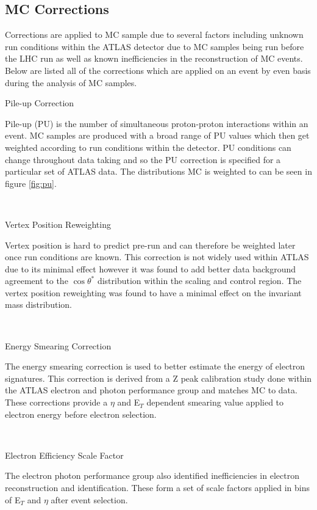 \subsection{MC Corrections}
   \label{sec:correc}

   Corrections are applied to MC sample due to several factors including unknown run conditions within the ATLAS detector due to MC samples being run before the LHC run as well as known inefficiencies in the reconstruction of MC events. Below are listed all of the corrections which are applied on an event by even basis during the analysis of MC samples.\\


   {\bf\raggedright Pile-up Correction}

   {\raggedright Pile-up (PU) is the number of simultaneous proton-proton interactions within an event. MC samples are produced with a broad range of PU values which then get weighted according to run conditions within the detector. PU conditions can change throughout data taking and so the PU correction is specified for a particular set of ATLAS data. The distributions MC is weighted to can be seen in figure \ref{fig:pu}.}\\

   {\bf\raggedright Vertex Position Reweighting}

   {\raggedright Vertex position is hard to predict pre-run and can therefore be weighted later once run conditions are known. This correction is not widely used within ATLAS due to its minimal effect however it was found to add better data background agreement to the $\cos{\theta^{*}}$ distribution within the scaling and control region. The vertex position reweighting was found to have a minimal effect on the invariant mass distribution.}\\

   {\bf\raggedright Energy Smearing Correction}

   {\raggedright The energy smearing correction is used to better estimate the energy of electron signatures. This correction is derived from a Z peak calibration study \cite{ATLAS-CONF-2014-032} done within the ATLAS electron and photon performance group and matches MC to data. These corrections provide a $\eta$ and E$_{T}$ dependent smearing value applied to electron energy before electron selection.}\\

   {\bf\raggedright Electron Efficiency Scale Factor}

   {\raggedright The electron photon performance group also identified inefficiencies in electron reconstruction and identification. These form a set of scale factors applied in bins of E$_{T}$ and $\eta$ after event selection.}\\


